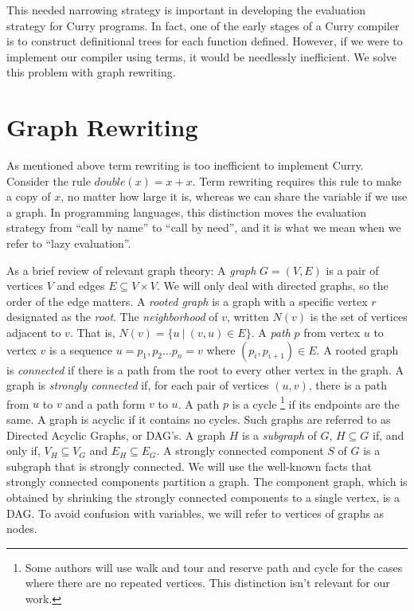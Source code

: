 \documentclass{book}
\theoremstyle{definition}
\begin{document}
This needed narrowing strategy is important in developing the evaluation strategy for Curry programs.
In fact, one of the early stages of a Curry compiler is to construct definitional trees
for each function defined.
However, if we were to implement our compiler using terms, it would be needlessly inefficient.
We solve this problem with graph rewriting.

\section{Graph Rewriting}
As mentioned above term rewriting is too inefficient to implement Curry.
Consider the rule $double(x) = x + x$.
Term rewriting requires this rule to make a copy of $x$, no matter how large it is,
whereas we can share the variable if we use a graph.
In programming languages, this distinction moves the evaluation strategy from
``call by name'' to ``call by need'', and it is what we mean when we refer to ``lazy evaluation''.


As a brief review of relevant graph theory:
A \emph{graph} $G = (V,E)$ is a pair of vertices $V$ and edges $E \subseteq V \times V$.
We will only deal with directed graphs, so the order of the edge matters.
A \emph{rooted graph} is a graph with a specific vertex $r$ designated as the \emph{root}.
The \emph{neighborhood} of $v$, written $N(v)$ is the set of vertices adjacent to $v$.
That is, $N(v) = \{u\ \vert\ (v,u) \in E\}$.
A \emph{path} $p$ from vertex $u$ to vertex $v$ is a sequence 
$u = p_1, p_2 \ldots p_n = v$ where $(p_i,p_{i+1}) \in E$.
A rooted graph is \emph{connected} 
if there is a path from the root to every other vertex in the graph.
A graph is \emph{strongly connected} if, 
for each pair of vertices $(u,v)$, there is a path from $u$ to $v$
and a path form $v$ to $u$.
A path $p$ is a cycle
\footnote{Some authors will use walk and tour and
          reserve path and cycle for the cases where there are no repeated vertices.
          This distinction isn't relevant for our work.}
if its endpoints are the same.
A graph is acyclic if it contains no cycles.
Such graphs are referred to as Directed Acyclic Graphs, or DAG's.
A graph $H$ is a \emph{subgraph} of $G$, $H \subseteq G$ if, and only if, $V_H \subseteq V_G$
and $E_H \subseteq E_G$.
A strongly connected component $S$ of $G$ is a subgraph that is strongly connected.
We will use the well-known facts that strongly connected components partition a graph.
The component graph, which is obtained by shrinking the strongly connected components 
to a single vertex, is a DAG.
To avoid confusion with variables, we will refer to vertices of graphs as nodes.
\end{document}
